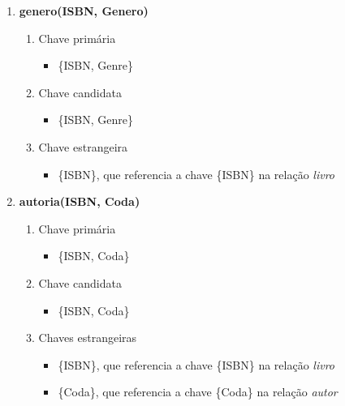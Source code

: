 \documentclass {report}
\begin{document}
\begin{enumerate}[label=-]
    \item \textbf{genero(ISBN, Genero)}
    \begin{enumerate}[label=\arabic*.]
        \item Chave primária
            \begin{itemize}
                \item \{ISBN, Genre\}
            \end{itemize}
        \item Chave candidata
            \begin{itemize}
                \item \{ISBN, Genre\}
            \end{itemize}
        \item Chave estrangeira
            \begin{itemize}
                \item \{ISBN\}, que referencia a chave \{ISBN\} na relação \textit{livro}
            \end{itemize}
    \end{enumerate}
    
    \item \textbf{autoria(ISBN, Coda)}
    \begin{enumerate}[label=\arabic*.]
        \item Chave primária
            \begin{itemize}
                \item \{ISBN, Coda\}
            \end{itemize}
        \item Chave candidata
            \begin{itemize}
                \item \{ISBN, Coda\}
            \end{itemize}
        \item Chaves estrangeiras
            \begin{itemize}
                \item \{ISBN\}, que referencia a chave \{ISBN\} na relação \textit{livro}
                \item \{Coda\}, que referencia a chave \{Coda\} na relação \textit{autor}
            \end{itemize}
    \end{enumerate}
    

\end{enumerate}
\end{document}
